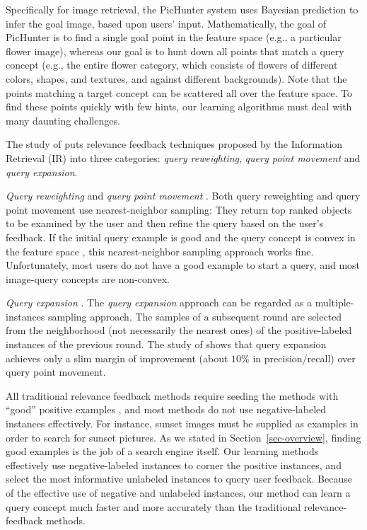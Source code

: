 Specifically for image retrieval, the PicHunter 
system \cite{PicHunter96a,PicHunter96b,PicHunter97,CMM00} 
uses Bayesian
prediction to infer the goal image, based upon users' input.
Mathematically, the goal of PicHunter is 
to find a single goal point in the feature
space (e.g., a particular flower image), whereas our goal is
to hunt down all points that match a query concept
(e.g., the entire flower category,
which consists of flowers of different colors, shapes, and
textures, and against different backgrounds).  Note that
the points matching a target concept can be scattered all over 
the feature space. To find these points
quickly with few hints, 
our learning algorithms must deal with many daunting challenges.

The study of \cite{PMO99} puts relevance feedback techniques
proposed by the Information Retrieval (IR) 
into three categories: {\it query reweighting},
{\it query point movement} and {\it query expansion}.
\begin{jlist}
\item {\it Query reweighting} and {\it query point movement}
\cite{ISF98,ORCWMH98,ORCMH97,PCM99,RHOM98}.
Both query reweighting and query point movement
use nearest-neighbor sampling: They return top ranked
objects to be examined by the user and then refine the query
based on the user's feedback. If the initial query example
is good and the query concept is convex in the feature space
\cite{ISF98,WFSP00}, this nearest-neighbor sampling approach works
fine. Unfortunately, most users do not have a good example to
start a query, and most image-query concepts are non-convex.

\item {\it Query expansion} \cite{PMO99,WFSP00}.
The {\it query expansion} approach can be
regarded as a multiple-instances sampling approach.
The samples of a subsequent round are selected from the
neighborhood (not necessarily the nearest ones) of the
positive-labeled instances of the previous round. The study
of \cite{PMO99} shows that query expansion
achieves only a slim margin of improvement (about $10\%$
in precision/recall) over query point movement.
\end{jlist}

All traditional relevance feedback methods
require seeding the methods with ``good''
positive examples \cite{img11,img13,HVO99,MM96,SC,img12,img9},
and most methods do not use negative-labeled instances effectively.
For instance, sunset images must be supplied 
as examples in order to search for sunset pictures.
As we stated in Section~\ref{sec-overview},
finding good examples is the job of a search engine itself.
Our learning methods effectively use negative-labeled
instances to corner the positive instances, and 
select the most informative unlabeled instances to query
user feedback.  Because of the effective use of negative
and unlabeled instances, our method can learn a query
concept much faster and more accurately than the traditional
relevance-feedback methods.

